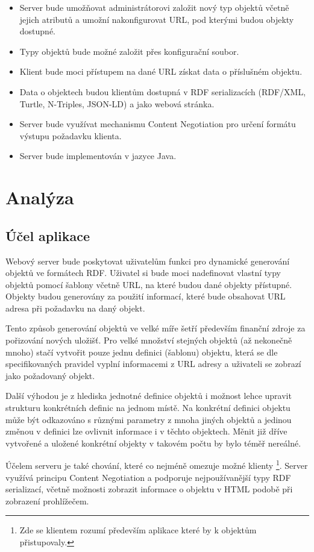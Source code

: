 \documentclass[thesis=B,czech]{FITthesis}[2012/06/26]
\begin{document}
 \begin{itemize}
  \item Server bude umožňovat administrátorovi založit nový typ objektů včetně jejich atributů a umožní nakonfigurovat URL, pod kterými budou objekty dostupné. 
  \item Typy objektů bude možné založit přes konfigurační soubor. 
  \item Klient bude moci přístupem na dané URL získat data o příslušném objektu. 
  \item Data o objektech budou klientům dostupná v RDF serializacích (RDF/XML, Turtle, N-Triples, JSON-LD) a jako webová stránka.
  \item Server bude využívat mechanismu Content Negotiation pro určení formátu výstupu požadavku klienta. 
  \item Server bude implementován v jazyce Java.
 \end{itemize}
\chapter{Analýza}

\section{Účel aplikace}
Webový server bude poskytovat uživatelům funkci pro dynamické generování objektů ve formátech RDF.
Uživatel si bude moci nadefinovat vlastní typy objektů pomocí šablony včetně URL, na které budou dané objekty přístupné.
Objekty budou generovány za použití informací, které bude obsahovat URL adresa při požadavku na daný objekt.

Tento způsob generování objektů ve velké míře šetří především finanční zdroje za pořizování nových uložišť. Pro velké množství stejných objektů (až nekonečně mnoho)
stačí vytvořit pouze jednu definici (šablonu) objektu, která se dle specifikovaných pravidel vyplní informacemi z URL adresy a uživateli se zobrazí jako 
požadovaný objekt.

Další výhodou je z hlediska jednotné definice objektů i možnost lehce upravit strukturu konkrétních definic na jednom místě.
Na konkrétní definici objektu může být odkazováno s různými parametry z mnoha jiných objektů a jedinou změnou v definici lze ovlivnit informace i v těchto objektech.
Měnit již dříve vytvořené a uložené konkrétní objekty v takovém počtu by bylo téměř nereálné.

Účelem serveru je také chování, které co nejméně omezuje možné klienty \footnote{Zde se klientem rozumí především aplikace které by k objektům přistupovaly.}.
Server využívá principu Content Negotiation \cite{content_negotiation} a podporuje nejpoužívanější typy RDF serializací, včetně možnosti zobrazit informace 
o objektu v HTML podobě při zobrazení prohlížečem.
\end{document}
